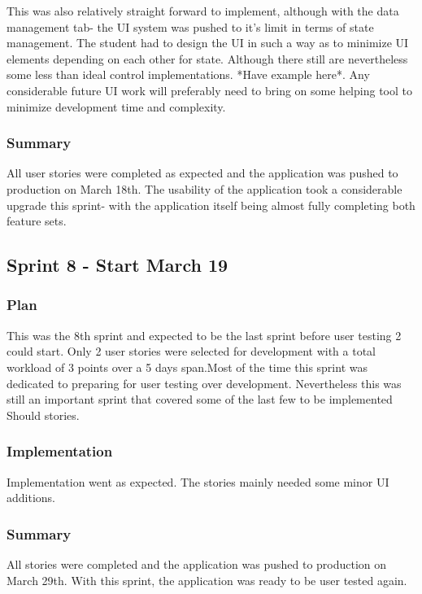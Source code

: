 This was also relatively straight forward to implement, although with the data management tab- the UI system was pushed to it's limit in terms of state management. The student had to design the UI in such a way as to minimize UI elements depending on each other for state. Although there still are nevertheless some less than ideal control implementations. *Have example here*. Any considerable future UI work will preferably need to bring on some helping tool to minimize development time and complexity.

\subsubsection{Summary}
All user stories were completed as expected and the application was pushed to production on March 18th. The usability of the application took a considerable upgrade this sprint- with the application itself being almost fully completing both feature sets.

\subsection{Sprint 8 - Start March 19}
\subsubsection{Plan}
This was the 8th sprint and expected to be the last sprint before user testing 2 could start. Only 2 user stories were selected for development with a total workload of 3 points over a 5 days span.Most of the time this sprint was dedicated to preparing for user testing over development. Nevertheless this was still an important sprint that covered some of the last few to be implemented Should stories.

\subsubsection{Implementation}
Implementation went as expected. The stories mainly needed some minor UI additions.

\subsubsection{Summary}
All stories were completed and the application was pushed to production on March 29th. With this sprint, the application was ready to be user tested again.

